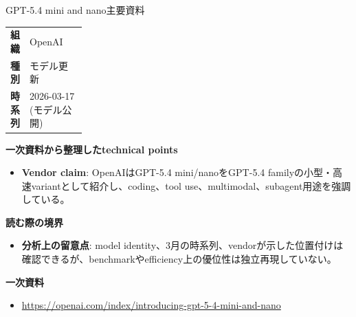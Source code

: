 \begin{technicalnote}{GPT-5.4 mini and nano}{主要資料}
\begingroup
\begin{tabularx}{\linewidth}{@{}>{\bfseries}p{0.22\linewidth}X@{}}
組織 & OpenAI \\
種別 & モデル更新 \\
時系列 & 2026-03-17 (モデル公開) \\
\end{tabularx}
\smallskip
{\bfseries 一次資料から整理したtechnical points}
\begin{itemize}[leftmargin=1.5em,itemsep=0.35em]
\item \textbf{Vendor claim}: OpenAIはGPT-5.4 mini/nanoをGPT-5.4 familyの小型・高速variantとして紹介し、coding、tool use、multimodal、subagent用途を強調している。
\end{itemize}
\begin{minipage}{\linewidth}
{\bfseries 読む際の境界}
\begin{itemize}[leftmargin=1.5em,itemsep=0.35em]
\item \textbf{分析上の留意点}: model identity、3月の時系列、vendorが示した位置付けは確認できるが、benchmarkやefficiency上の優位性は独立再現していない。
\end{itemize}
\begin{samepage}
{\bfseries 一次資料}
\begingroup\sloppy
\begin{itemize}[leftmargin=1.5em,itemsep=0.25em]
\item {\scriptsize\url{https://openai.com/index/introducing-gpt-5-4-mini-and-nano}}
\end{itemize}
\endgroup
\end{samepage}
\end{minipage}
\endgroup
\end{technicalnote}
\medskip

